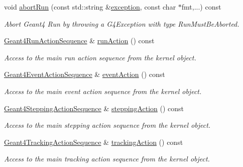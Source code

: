 \begin{DoxyCompactItemize}
void \hyperlink{class_d_d4hep_1_1_simulation_1_1_geant4_action_aed0d02c2f482dc0435b6ca51504356be}{abortRun} (const std::string \&\hyperlink{classstd_1_1exception}{exception}, const char $\ast$fmt,...) const 
\begin{DoxyCompactList}\small\item\em Abort Geant4 Run by throwing a G4Exception with type RunMustBeAborted. \item\end{DoxyCompactList}\item 
\hyperlink{class_d_d4hep_1_1_simulation_1_1_geant4_run_action_sequence}{Geant4RunActionSequence} \& \hyperlink{class_d_d4hep_1_1_simulation_1_1_geant4_action_a242b367d623151c0cd3a892915f371b9}{runAction} () const 
\begin{DoxyCompactList}\small\item\em Access to the main run action sequence from the kernel object. \item\end{DoxyCompactList}\item 
\hyperlink{class_d_d4hep_1_1_simulation_1_1_geant4_event_action_sequence}{Geant4EventActionSequence} \& \hyperlink{class_d_d4hep_1_1_simulation_1_1_geant4_action_a5ac8a0e311d6f5b7d297de21dfcd56a7}{eventAction} () const 
\begin{DoxyCompactList}\small\item\em Access to the main event action sequence from the kernel object. \item\end{DoxyCompactList}\item 
\hyperlink{class_d_d4hep_1_1_simulation_1_1_geant4_stepping_action_sequence}{Geant4SteppingActionSequence} \& \hyperlink{class_d_d4hep_1_1_simulation_1_1_geant4_action_a7dd8d0f77997e948fefb72f0d0a2179e}{steppingAction} () const 
\begin{DoxyCompactList}\small\item\em Access to the main stepping action sequence from the kernel object. \item\end{DoxyCompactList}\item 
\hyperlink{class_d_d4hep_1_1_simulation_1_1_geant4_tracking_action_sequence}{Geant4TrackingActionSequence} \& \hyperlink{class_d_d4hep_1_1_simulation_1_1_geant4_action_aa62c971500809db112b2cb4a8732b748}{trackingAction} () const 
\begin{DoxyCompactList}\small\item\em Access to the main tracking action sequence from the kernel object. \item\end{DoxyCompactList}\item 

\end{DoxyCompactItemize}
